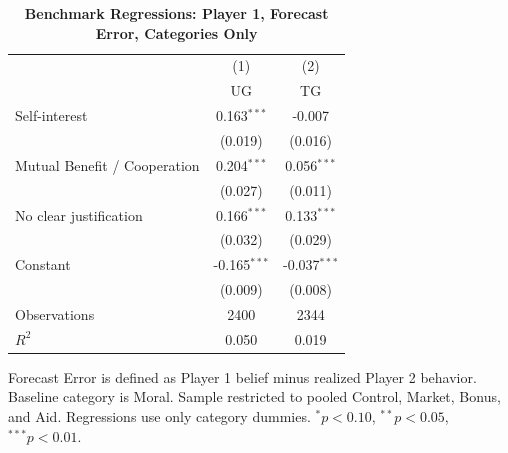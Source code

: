\begin{table}[!htbp]
\centering
\caption{\textbf{Benchmark Regressions: Player 1, Forecast Error, Categories Only}}
\label{tab:cats_only_cats_only_fe_regs}
\begin{tabular}{lcc}
\toprule
 & (1) & (2) \\
 & UG & TG \\
\midrule
Self-interest & 0.163$^{***}$ & -0.007 \\
 & (0.019) & (0.016) \\
Mutual Benefit / Cooperation & 0.204$^{***}$ & 0.056$^{***}$ \\
 & (0.027) & (0.011) \\
No clear justification & 0.166$^{***}$ & 0.133$^{***}$ \\
 & (0.032) & (0.029) \\
Constant & -0.165$^{***}$ & -0.037$^{***}$ \\
 & (0.009) & (0.008) \\
\midrule
Observations & 2400 & 2344 \\
$R^2$ & 0.050 & 0.019 \\
\bottomrule
\end{tabular}
\begin{flushleft}
\footnotesize Forecast Error is defined as Player 1 belief minus realized Player 2 behavior. Baseline category is Moral. Sample restricted to pooled Control, Market, Bonus, and Aid. Regressions use only category dummies. $^{*}p<0.10$, $^{**}p<0.05$, $^{***}p<0.01$.
\end{flushleft}
\end{table}
